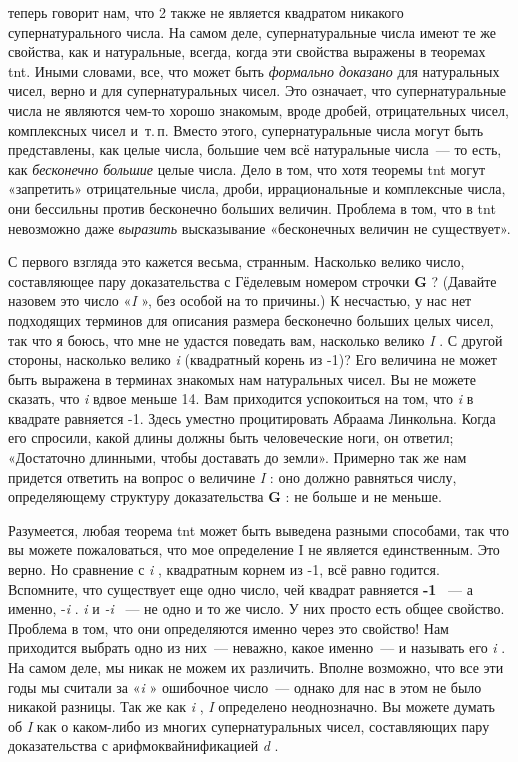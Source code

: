 \documentclass[../main.tex]{subfiles}
\begin{document}
теперь говорит нам, что 2 также не является квадратом никакого супернатурального числа. На самом деле, супернатуральные числа имеют те же свойства, как и натуральные, всегда, когда эти свойства выражены в теоремах \acs{tnt}\@. Иными словами, все, что может быть \emph{формально доказано} для натуральных чисел, верно и для супернатуральных чисел. Это означает, что супернатуральные числа не являются чем-то хорошо знакомым, вроде дробей, отрицательных чисел, комплексных чисел и~т.\,п. Вместо этого, супернатуральные числа могут быть представлены, как целые числа, большие чем всё натуральные числа~--- то есть, как \emph{бесконечно большие} целые числа. Дело в том, что хотя теоремы \acs{tnt} могут «запретить» отрицательные числа, дроби, иррациональные и комплексные числа, они бессильны против бесконечно больших величин. Проблема в том, что в \acs{tnt} невозможно даже \emph{выразить} высказывание «бесконечных величин не существует».

С первого взгляда это кажется весьма, странным. Насколько велико число, составляющее пару доказательства с Гёделевым номером строчки \textbf{G} ? (Давайте назовем это число «\emph{I} », без особой на то причины.) К несчастью, у нас нет подходящих терминов для описания размера бесконечно больших целых чисел, так что я боюсь, что мне не удастся поведать вам, насколько велико \emph{I} . С другой стороны, насколько велико \emph{i} (квадратный корень из -1)? Его величина не может быть выражена в терминах знакомых нам натуральных чисел. Вы не можете сказать, что \emph{i} вдвое меньше 14. Вам приходится успокоиться на том, что \emph{i} в квадрате равняется -1. Здесь уместно процитировать Абраама Линкольна. Когда его спросили, какой длины должны быть человеческие ноги, он ответил; «Достаточно длинными, чтобы доставать до земли». Примерно так же нам придется ответить на вопрос о величине \emph{I} : оно должно равняться числу, определяющему структуру доказательства \textbf{G} : не больше и не меньше.

Разумеется, любая теорема \acs{tnt} может быть выведена разными способами, так что вы можете пожаловаться, что мое определение I не является единственным. Это верно. Но сравнение с \emph{i} , квадратным корнем из -1, всё равно годится. Вспомните, что существует еще одно число, чей квадрат равняется \textbf{-1} ~--- а именно, -\emph{i} . \emph{i} и \emph{-i} ~--- не одно и то же число. У них просто есть общее свойство. Проблема в том, что они определяются именно через это свойство! Нам приходится выбрать одно из них~--- неважно, какое именно~--- и называть его \emph{i} . На самом деле, мы никак не можем их различить. Вполне возможно, что все эти годы мы считали за «\emph{i} » ошибочное число~--- однако для нас в этом не было никакой разницы. Так же как \emph{i} , \emph{I} определено неоднозначно. Вы можете думать об \emph{I} как о каком-либо из многих супернатуральных чисел, составляющих пару доказательства с арифмоквайнификацией \emph{d} .
\end{document}
